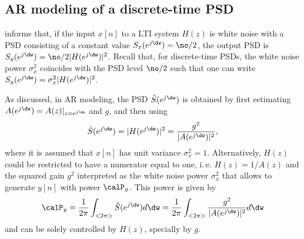 %
%


\subsection{AR modeling of a discrete-time PSD}

 informs that, if the input $x[n]$ to a LTI system $H(z)$ is white noise with a PSD consisting of a constant value $S_x(e^{j \dw})=\no/2$, the output PSD is $S_y(e^{j \dw})=\no/2 |H(e^{j \dw})|^2$. Recall that, for discrete-time PSDs, the white noise power $\sigma_x^2$ coincides with the PSD level $\no/2$ such that 
one can write $S_y(e^{j \dw})=\sigma_x^2 |H(e^{j \dw})|^2$.

As discussed, in AR modeling, the PSD $\hat S(e^{j \dw})$ is obtained by first estimating $A(e^{j \dw}) = A(z)|_{z=e^{j \dw}}$ and $g$, and then using
\begin{equation}
\hat S(e^{j \dw}) = |H(e^{j \dw})|^2 = \frac {g^2} {|A(e^{j \dw})|^2},
\label{eq:ar_psd}
\end{equation}
where it is assumed that $x[n]$ has unit variance $\sigma_x^2=1$. Alternatively, $H(z)$ could be restricted to have a numerator equal to one, i.\,e. $H(z)=1/A(z)$ and the squared gain $g^2$ interpreted as the white noise power $\sigma_x^2$ that allows to generate $y[n]$ with power $\calP_y$. This power is given by
\[
\calP_y = \frac{1}{2\pi}\int_{<2\pi>} \hat S(e^{j \dw}) d \dw = \frac{1}{2\pi} \int_{<2\pi>} \frac{g^2}{|A(e^{j \dw})|^2} d \dw
\]
and can be solely controlled by $H(z)$, specially by $g$.

